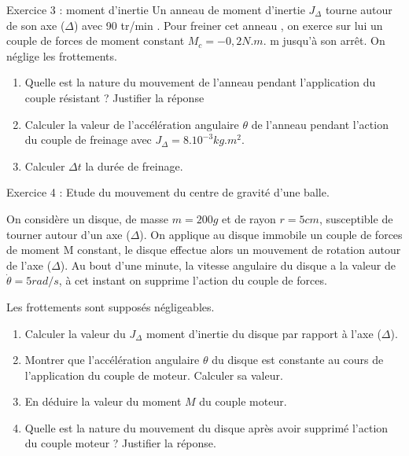 \documentclass[12pt, french]{article}
\begin{document}
\begin{Box2}{Exercice 3 : moment d’inertie }
  Un anneau de moment d’inertie $J_{\Delta}$ tourne autour de son axe ($\Delta$) avec 90 tr/min .
Pour freiner cet anneau , on exerce sur lui un couple de forces de moment constant
$M_c = -0,2N.m$. m jusqu’à son arrêt.
On néglige les frottements.
\begin{enumerate}
  \item Quelle est la nature du mouvement de l’anneau pendant l’application du couple
résistant ? Justifier la réponse  
\item Calculer la valeur de l’accélération angulaire $\theta$ de l’anneau pendant l’action du
  couple de freinage avec $J_{\Delta} = 8.10^{-3}kg.m^2$.
\item Calculer $\Delta{t}$ la durée de freinage.

\end{enumerate}
\end{Box2}

\begin{Box2}{Exercice 4 : Etude du mouvement du centre de gravité d’une balle. }

  On considère un disque, de masse $m = 200 g$ et de rayon $r = 5 cm$, susceptible de
tourner autour d’un axe ($\Delta$). On applique au disque immobile un couple de forces de
moment M constant, le disque effectue alors un mouvement de rotation autour de
l’axe ($\Delta$). Au bout d’une minute, la vitesse angulaire du disque a la valeur de $\dot{\theta} = 5 rad/s$, à cet instant on supprime l’action du couple de forces.

Les frottements sont supposés négligeables.

\begin{enumerate}
  \item Calculer la valeur du $J_{\Delta}$ moment d’inertie du disque par rapport à l’axe ($\Delta$).
  \item Montrer que l’accélération angulaire $\theta$ du disque est constante au cours de
l’application du couple de moteur. Calculer sa valeur.
\item En déduire la valeur du moment $M$ du couple moteur.
\item Quelle est la nature du mouvement du disque après avoir supprimé l’action du couple
moteur ? Justifier la réponse.

\end{enumerate}
\end{Box2}
\end{document}
